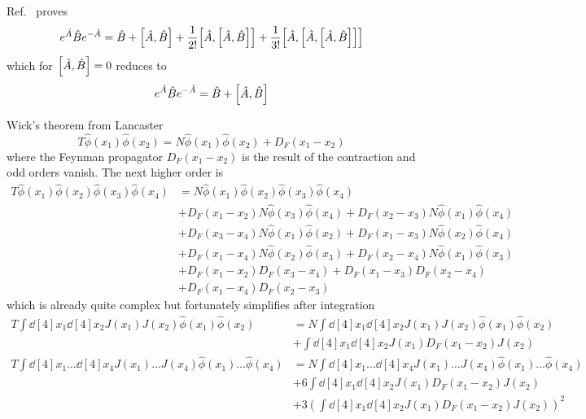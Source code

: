 Ref.~\cite[p.~40]{Barnett2002} proves
\begin{equation}
	e^{\hat{A}}
	\hat{B}
	e^{-\hat{A}}
	=
	\hat{B}
	+
	\comm{\hat{A}}{\hat{B}}
	+
	\frac{1}{2!}
	\comm{\hat{A}}{\comm{\hat{A}}{\hat{B}}}
	+
	\frac{1}{3!}
	\comm{\hat{A}}{\comm{\hat{A}}{\comm{\hat{A}}{\hat{B}}}}
\end{equation}
which for $\comm{\hat{A}}{\hat{B}}=0$ reduces to
\begin{equation}
	e^{\hat{A}}
	\hat{B}
	e^{-\hat{A}}
	=
	\hat{B}
	+
	\comm{\hat{A}}{\hat{B}}
\end{equation}

Wick's theorem from Lancaster~\cite[p.~173]{Lancaster2014}
\begin{equation}
	T
	\hat\phi(x_1)
	\hat\phi(x_2)
	=
	N
	\hat\phi(x_1)
	\hat\phi(x_2)
	+
	D_F(x_1-x_2)	
\end{equation}
where the Feynman propagator $D_F(x_1-x_2)$ is the result of the contraction and odd orders vanish.
The next higher order is
\begin{equation}
	\begin{split}
		T
		\hat\phi(x_1)
		\hat\phi(x_2)
		\hat\phi(x_3)
		\hat\phi(x_4)
		&=
		N
		\hat\phi(x_1)
		\hat\phi(x_2)
		\hat\phi(x_3)
		\hat\phi(x_4)
		\\
		&+
		D_F(x_1-x_2)
		N
		\hat\phi(x_3)
		\hat\phi(x_4)
		+
		D_F(x_2-x_3)
		N
		\hat\phi(x_1)
		\hat\phi(x_4)
		\\
		&+
		D_F(x_3-x_4)
		N
		\hat\phi(x_1)
		\hat\phi(x_2)
		+
		D_F(x_1-x_3)
		N
		\hat\phi(x_2)
		\hat\phi(x_4)
		\\
		&+
		D_F(x_1-x_4)
		N
		\hat\phi(x_2)
		\hat\phi(x_3)
		+
		D_F(x_2-x_4)
		N
		\hat\phi(x_1)
		\hat\phi(x_3)
		\\
		&+
		D_F(x_1-x_2)
		D_F(x_3-x_4)
		+
		D_F(x_1-x_3)
		D_F(x_2-x_4)
		\\
		&+
		D_F(x_1-x_4)
		D_F(x_2-x_3)
	\end{split}
\end{equation}
which is already quite complex but fortunately simplifies after integration
\begin{align*}
	T
	\int\dd[4]{x_1}\dd[4]{x_2}
	J(x_1)
	J(x_2)
	\hat\phi(x_1)
	\hat\phi(x_2)
	&=
	N
	\int\dd[4]{x_1}\dd[4]{x_2}
	J(x_1)
	J(x_2)
	\hat\phi(x_1)
	\hat\phi(x_2)
	\\
	&+
	\int\dd[4]{x_1}\dd[4]{x_2}
	J(x_1)
	D_F(x_1-x_2)
	J(x_2)
	\\
	T
	\int\dd[4]{x_1}\dots\dd[4]{x_4}
	J(x_1)
	\dots
	J(x_4)
	\hat\phi(x_1)
	\dots
	\hat\phi(x_4)
	&=
	N
	\int\dd[4]{x_1}\dots\dd[4]{x_4}
	J(x_1)
	\dots
	J(x_4)
	\hat\phi(x_1)
	\dots
	\hat\phi(x_4)
	\\
	&+
	6\int\dd[4]{x_1}\dd[4]{x_2}
	J(x_1)
	D_F(x_1-x_2)
	J(x_2)
	\\
	&+
	3\left(
		\int\dd[4]{x_1}\dd[4]{x_2}
		J(x_1)
		D_F(x_1-x_2)
		J(x_2)
	\right)^2
\end{align*}
